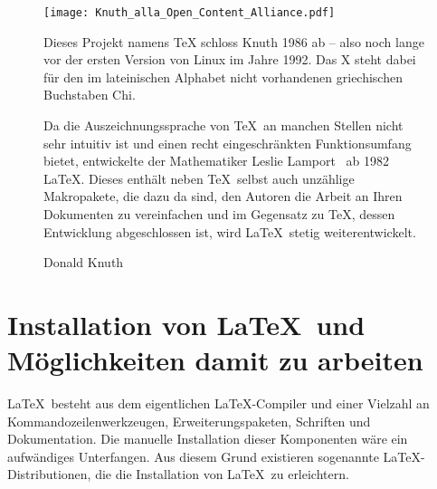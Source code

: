\begin{figure}[H]
	\begin{minipage}[t]{0.45\textwidth}
\vspace{-2mm}  
\texttt{[image: Knuth\_alla\_Open\_Content\_Alliance.pdf]}
\caption[Donald Knuth]{Donald Knuth\footnotemark}
\label{fig:DonaldKnuth}
	\end{minipage}
	\hfill
	\begin{minipage}[t]{0.5\textwidth}
\setlength{\parindent}{0pt}
\setlength{\parskip}{1.5ex plus 0.5ex minus 0.5ex}
Dieses Projekt namens TeX schloss Knuth 1986 ab -- also noch lange vor der ersten Version von Linux im Jahre 1992. Das X steht dabei für den im lateinischen Alphabet nicht vorhandenen griechischen Buchstaben Chi.

Da die Auszeichnungssprache von \TeX\ an manchen Stellen nicht sehr intuitiv ist und einen recht eingeschränkten Funktionsumfang bietet, entwickelte der Mathematiker Leslie Lamport~\cite{LeslieLamportWebpage} ab 1982 \LaTeX. Dieses enthält neben \TeX\ selbst auch unzählige Makropakete, die dazu da sind, den Autoren die Arbeit an Ihren Dokumenten zu vereinfachen und im Gegensatz zu \TeX, dessen Entwicklung abgeschlossen ist, wird \LaTeX\ stetig weiterentwickelt.
	\end{minipage}

\end{figure}







\section{Installation von \LaTeX\ und Möglichkeiten damit zu arbeiten}
\label{AbschnittInstallation}

\LaTeX\ besteht aus dem eigentlichen \LaTeX-Compiler und einer Vielzahl an Kommandozeilenwerkzeugen, Erweiterungspaketen, Schriften und Dokumentation. Die manuelle Installation dieser Komponenten wäre ein aufwändiges Unterfangen. Aus diesem Grund existieren sogenannte \LaTeX-Distributionen, die die Installation von \LaTeX\ zu erleichtern. 

